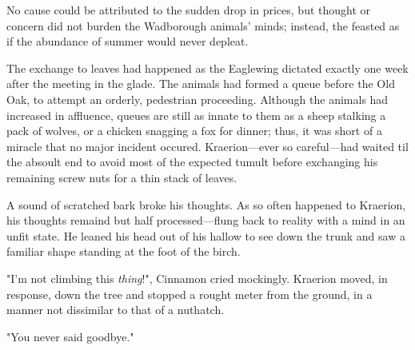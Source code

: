 No cause could be attributed to the sudden drop in prices, but thought or concern did not burden the Wadborough animals' minds; instead, the feasted as if the abundance of summer would never depleat. %

The exchange to leaves had happened as the Eaglewing dictated exactly one week after the meeting in the glade. The animals had formed a queue before the Old Oak, to attempt an orderly, pedestrian proceeding. Although the animals had increased in affluence, queues are still as innate to them as a sheep stalking a pack of wolves, or a chicken snagging a fox for dinner; thus, it was short of a miracle that no major incident occured. Kraerion---ever so careful---had waited til the absoult end to avoid most of the expected tumult before exchanging his remaining screw nuts for a thin stack of leaves.

A sound of scratched bark broke his thoughts. As so often happened to Kraerion, his thoughts remaind but half processed---flung back to reality with a mind in an unfit state. He leaned his head out of his hallow to see down the trunk and saw a familiar shape standing at the foot of the birch.

"I'm not climbing this \textit{thing}!", Cinnamon cried mockingly. Kraerion moved, in response, down the tree and stopped a rought meter from the ground, in a manner not dissimilar to that of a nuthatch.

"You never said goodbye."



